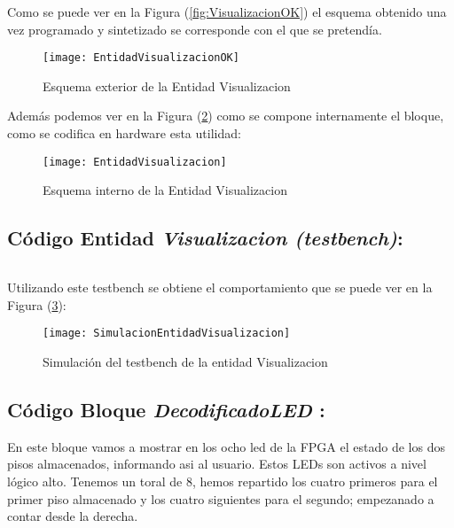 	Como se puede ver en la Figura (\ref{fig:VisualizacionOK}) el esquema obtenido una vez programado y sintetizado se corresponde con el que se pretendía.
    \begin{figure}[H]
		    \centering
		    \texttt{[image: EntidadVisualizacionOK]}
		    \caption{Esquema exterior de la Entidad Visualizacion}
		    \label{fig:EntidadVisualizacionOK}
	\end{figure}
    Además podemos ver en la Figura (\ref{fig:EntidadVisualizacionImplementacion}) como se compone internamente el bloque, como se codifica en hardware esta utilidad:
    \begin{figure}[H]
		    \centering
		    \texttt{[image: EntidadVisualizacion]}
		    \caption{Esquema interno de la Entidad Visualizacion}
		    \label{fig:EntidadVisualizacionImplementacion}
	\end{figure}

\subsection{Código Entidad \textit{Visualizacion (testbench)}:} \label{code:Visualizacion_tb}
	\inputminted[frame=lines,fontsize=\footnotesize,linenos]{vhdl}{CodeFiles/EntidadVisualizacion_tb.vhd}

    Utilizando este testbench se obtiene el comportamiento que se puede ver en la Figura (\ref{fig:SimulacionEntidadVisualizacion}):

    \begin{figure}[H]
		    \centering
		    \texttt{[image: SimulacionEntidadVisualizacion]}
		    \caption{Simulación del testbench de la entidad Visualizacion}
		    \label{fig:SimulacionEntidadVisualizacion}
	\end{figure}

\subsection {Código Bloque \textit{DecodificadoLED} :} \label{code:DecodificadorLED}
	En este bloque vamos a mostrar en los ocho led de la FPGA el estado de los dos pisos almacenados, informando asi al usuario. Estos LEDs son activos a nivel lógico alto. Tenemos un toral de 8, hemos repartido los cuatro primeros para el primer piso almacenado y los cuatro siguientes para el segundo; empezanado a contar desde la derecha.
	\inputminted[frame=lines,fontsize=\footnotesize,linenos]{vhdl}{CodeFiles/DecodificadorLED.vhd}

